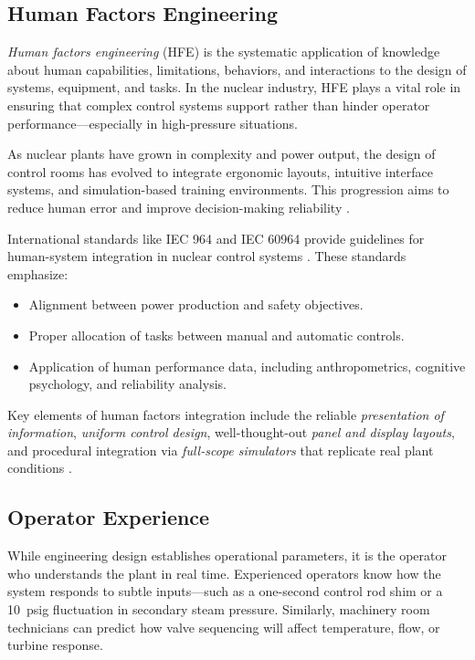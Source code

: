 \documentclass[12pt]{article}
\begin{document}
\subsection{Human Factors Engineering}

\textit{Human factors engineering} (HFE) is the systematic application of knowledge about human capabilities, limitations, behaviors, and interactions to the design of systems, equipment, and tasks. In the nuclear industry, HFE plays a vital role in ensuring that complex control systems support rather than hinder operator performance—especially in high-pressure situations.

As nuclear plants have grown in complexity and power output, the design of control rooms has evolved to integrate ergonomic layouts, intuitive interface systems, and simulation-based training environments. This progression aims to reduce human error and improve decision-making reliability \autocite{moderninstruments}.

International standards like IEC 964 and IEC 60964 provide guidelines for human-system integration in nuclear control systems \autocite{iec60964, iec964}. These standards emphasize:

\begin{itemize}
  \item Alignment between power production and safety objectives.
  \item Proper allocation of tasks between manual and automatic controls.
  \item Application of human performance data, including anthropometrics, cognitive psychology, and reliability analysis.
\end{itemize}

Key elements of human factors integration include the reliable \textit{presentation of information}, \textit{uniform control design}, well-thought-out \textit{panel and display layouts}, and procedural integration via \textit{full-scope simulators} that replicate real plant conditions \autocite{iec60964, iec964}.

\subsection{Operator Experience}

While engineering design establishes operational parameters, it is the operator who understands the plant in real time. Experienced operators know how the system responds to subtle inputs—such as a one-second control rod shim or a \SI{10}{psig} fluctuation in secondary steam pressure. Similarly, machinery room technicians can predict how valve sequencing will affect temperature, flow, or turbine response.
\end{document}
